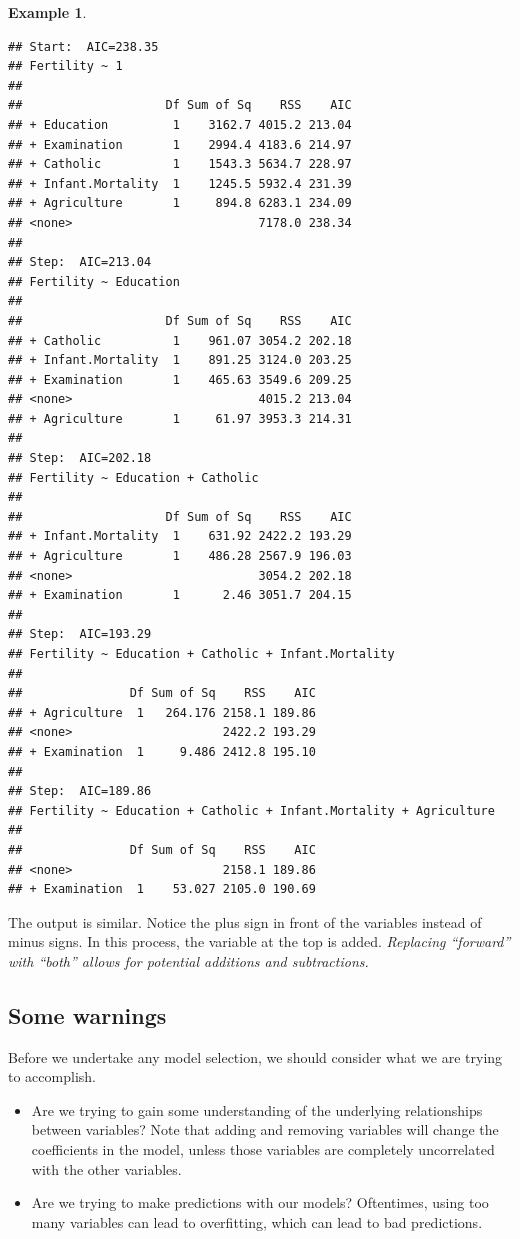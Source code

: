 \documentclass[
]{book}
\theoremstyle{definition}
\theoremstyle{definition}
\newtheorem{example}{Example}[chapter]
\theoremstyle{definition}
\theoremstyle{definition}
\theoremstyle{remark}
\begin{document}
\begin{examplebox}
\begin{example}
\begin{verbatim}
## Start:  AIC=238.35
## Fertility ~ 1
## 
##                    Df Sum of Sq    RSS    AIC
## + Education         1    3162.7 4015.2 213.04
## + Examination       1    2994.4 4183.6 214.97
## + Catholic          1    1543.3 5634.7 228.97
## + Infant.Mortality  1    1245.5 5932.4 231.39
## + Agriculture       1     894.8 6283.1 234.09
## <none>                          7178.0 238.34
## 
## Step:  AIC=213.04
## Fertility ~ Education
## 
##                    Df Sum of Sq    RSS    AIC
## + Catholic          1    961.07 3054.2 202.18
## + Infant.Mortality  1    891.25 3124.0 203.25
## + Examination       1    465.63 3549.6 209.25
## <none>                          4015.2 213.04
## + Agriculture       1     61.97 3953.3 214.31
## 
## Step:  AIC=202.18
## Fertility ~ Education + Catholic
## 
##                    Df Sum of Sq    RSS    AIC
## + Infant.Mortality  1    631.92 2422.2 193.29
## + Agriculture       1    486.28 2567.9 196.03
## <none>                          3054.2 202.18
## + Examination       1      2.46 3051.7 204.15
## 
## Step:  AIC=193.29
## Fertility ~ Education + Catholic + Infant.Mortality
## 
##               Df Sum of Sq    RSS    AIC
## + Agriculture  1   264.176 2158.1 189.86
## <none>                     2422.2 193.29
## + Examination  1     9.486 2412.8 195.10
## 
## Step:  AIC=189.86
## Fertility ~ Education + Catholic + Infant.Mortality + Agriculture
## 
##               Df Sum of Sq    RSS    AIC
## <none>                     2158.1 189.86
## + Examination  1    53.027 2105.0 190.69
\end{verbatim}

The output is similar. Notice the plus sign in front of the variables instead of minus signs. In this process, the variable at the top is added. \emph{Replacing ``forward'' with ``both'' allows for potential additions and subtractions.}
\end{example}

\end{examplebox}

\subsection*{Some warnings}\label{some-warnings}

Before we undertake any model selection, we should consider what we are trying to accomplish.

\begin{itemize}
\item
  Are we trying to gain some understanding of the underlying relationships between variables? Note that adding and removing variables will change the coefficients in the model, unless those variables are completely uncorrelated with the other variables.
\item
  Are we trying to make predictions with our models? Oftentimes, using too many variables can lead to overfitting, which can lead to bad predictions.
\end{itemize}
\end{document}
